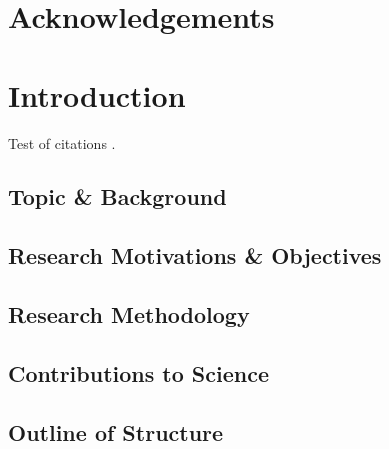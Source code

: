 \documentclass[a4paper, 12pt]{report}
\begin{document}
    \chapter*{Acknowledgements}
    \blindtext 


    \newpage
    \tableofcontents


    \newpage 
    \listoffigures


    \newpage
    \listoftables 




    \newpage
    \chapter{Introduction}
    \label{chapter: intro}

    Test of citations \citep{xu-2021}.

    \section{Topic \& Background}
    \label{section: topic}

    \section{Research Motivations \& Objectives}
    \label{section: motivations}

    \section{Research Methodology}
    \label{section: method}

    \section{Contributions to Science}
    \label{section: contributions}

    \section{Outline of Structure}
    \label{section: structure}
\end{document}
